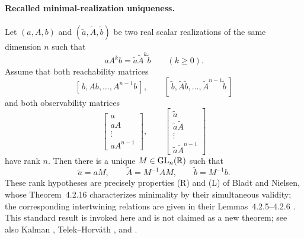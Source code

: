 \paragraph{Recalled minimal-realization uniqueness.}
Let \((a,A,b)\) and \((\widetilde a,\widetilde A,\widetilde b)\) be two real
scalar realizations of the same dimension \(n\) such that
\[
aA^k b=\widetilde a\widetilde A^k\widetilde b
\qquad(k\ge0).
\]
Assume that both reachability matrices
\[
[\,b,Ab,\ldots,A^{n-1}b\,],\qquad
[\,\widetilde b,\widetilde A\widetilde b,\ldots,
\widetilde A^{n-1}\widetilde b\,]
\]
and both observability matrices
\[
\begin{bmatrix}a\\aA\\\vdots\\aA^{n-1}\end{bmatrix},
\qquad
\begin{bmatrix}\widetilde a\\\widetilde a\widetilde A\\\vdots\\
\widetilde a\widetilde A^{n-1}\end{bmatrix}
\]
have rank \(n\). Then there is a unique \(M\in\operatorname{GL}_n(\mathbb{R})\)
such that
\[
\widetilde a=aM,
\qquad \widetilde A=M^{-1}AM,
\qquad \widetilde b=M^{-1}b.
\]
These rank hypotheses are precisely properties \textup{(R)} and \textup{(L)}
of Bladt and Nielsen, whose Theorem~4.2.16 characterizes minimality by their
simultaneous validity; the corresponding intertwining relations are given in
their Lemmas~4.2.5--4.2.6
\cite[Theorem~4.2.16, p.~216, and Lemmas~4.2.5--4.2.6,
p.~212]{BladtNielsen2017MatrixExponential}. This standard result is invoked
here and is not claimed as a new theorem; see also Kalman
\cite{Kalman1963LinearSystems}, Telek--Horv\'ath
\cite{TelekHorvath2007MinimalMAP}, and
\cite{Ryden1996Aggregated,OCinneide1989PhaseTypeNonuniqueness,
OCinneide1991InvariantPolytopes}.

